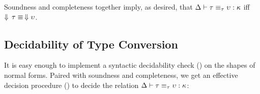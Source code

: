 \documentclass[sigplan,screen]{acmart}
\begin{document}
\begin{AgdaAlign}
\begin{code}
\AgdaSpace{}%
\AgdaSpace{}%
\AgdaSpace{}%
\<%
\\
%
\>[4]\AgdaSpace{}%
\AgdaSpace{}%
\AgdaSymbol{=}\<%
\\
\>[4][@{}l@{\AgdaIndent{0}}]%
\>[5]%
\>[14]\AgdaSpace{}%
\AgdaSpace{}%
\AgdaSpace{}%
\<%
\\
%
\>[5]\AgdaSpace{}%
\AgdaSymbol{(}\AgdaSpace{}%
\AgdaSymbol{)}%
\>[14]\AgdaSpace{}%
\AgdaSpace{}%
\AgdaSymbol{(}\AgdaSpace{}%
\AgdaSpace{}%
\AgdaSymbol{)}\AgdaSpace{}%
\<%
\\
%
\>[5]\AgdaSpace{}%
\AgdaSymbol{(}\AgdaSpace{}%
\AgdaSymbol{)}%
\>[14]\AgdaSpace{}%
\AgdaSpace{}%
\AgdaSpace{}%
\AgdaSpace{}%
\<%
\\
%
\>[5]\AgdaSpace{}%
\<%
\end{code}
\end{AgdaAlign}

\Ni Soundness and completeness together imply, as desired, that $\Delta \vdash \tau \equiv_{\tau} \upsilon : \kappa$ iff $\Downarrow\, \tau \equiv\, \Downarrow \upsilon$.

\subsection{Decidability of Type Conversion}

It is easy enough to implement a syntactic decidability check () on the shapes of normal forms. Paired with soundness and completeness, we get an effective decision procedure ()  to decide the relation $\Delta \vdash \tau \equiv_{\tau} \upsilon : \kappa$:
\end{document}
